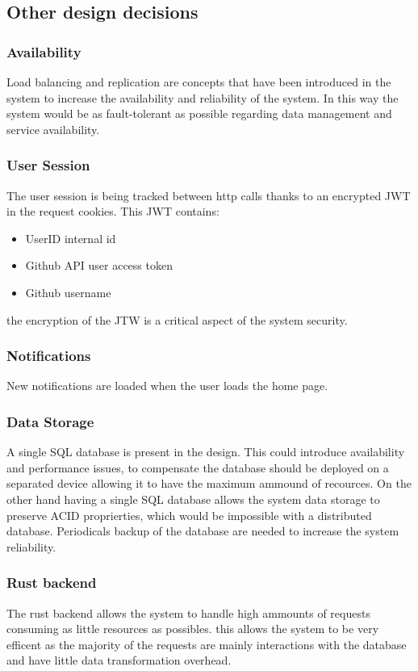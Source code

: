 \documentclass{article}
\begin{document}
\subsection{Other design decisions}
\subsubsection{Availability}
Load balancing and replication are concepts that have been introduced in the system to
increase the availability and reliability of the system. In this way the system would be as
fault-tolerant as possible regarding data management and service availability.
\subsubsection{User Session}
The user session is being tracked between http calls thanks to an encrypted JWT in the request cookies. This JWT contains:
\begin{itemize}
\item UserID internal id
\item Github API user access token
\item Github username
\end{itemize}
the encryption of the JTW is a critical aspect of the system security.
\subsubsection{Notifications}
New notifications are loaded when the user loads the home page.
\subsubsection{Data Storage}
A single SQL database is present in the design. This could introduce availability and performance issues, to compensate the database should be deployed on a separated device allowing it to have the maximum ammound of recources. On the other hand having a single SQL database allows the system data storage to preserve ACID proprierties, which would be impossible with a distributed database. Periodicals backup of the database are needed to increase the system reliability.
\subsubsection{Rust backend}
The rust backend allows the system to handle high ammounts of requests consuming as little resources as possibles. this allows the system to be very efficent as the majority of the requests are mainly interactions with the database and have little data transformation overhead.
\end{document}
